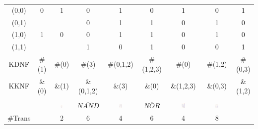 \begin{table}
\begin{tabular}{|c|c|c|c|c|c|c|c|c|}
\hline
(0,0) & 0 & 1 & 0 & 1 & 0 & 1 & 0 & 1\\
(0,1) &   &   & 0 & 1 & 1 & 0 & 1 & 0\\
(1,0) & 1 & 0 & 0 & 1 & 1 & 0 & 1 & 0\\
(1,1) &   &   & 1 & 0 & 1 & 0 & 0 & 1\\
\hline
KDNF & \#(1) & \#(0) & \#(3) & \#(0,1,2) & \#(1,2,3) & \#(0) & \#(1,2) & \#(0,3) \\
KKNF & \&(0) & \&(1) & \&(0,1,2) & \&(3) & \&(0) & \&(1,2,3) & \&(0,3) & \&(1,2)\\
\hline
& & & & & & & &\\
& & 
\includegraphics[width=0.12\textwidth]{pics/gates_schematic/inverter} & 
$ \overline{NAND} $ &
\includegraphics[width=0.12\textwidth]{pics/gates_schematic/NAND} &
$ \overline{NOR} $ &
\includegraphics[width=0.12\textwidth]{pics/gates_schematic/NOR} & \includegraphics[width=0.12\textwidth]{pics/gates_schematic/XOR} & 
\\
\hline
\#Trans & & 2 & 6 & 4 & 6 & 4 & 8 & \\
\hline
\end{tabular}
\end{table}